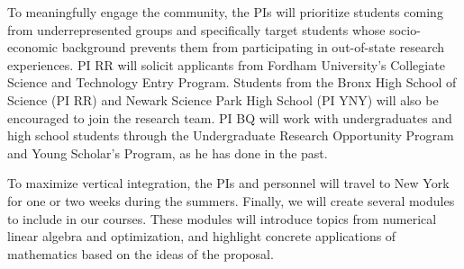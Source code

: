 To meaningfully engage the community,
the PIs will prioritize students coming
from underrepresented groups and
specifically target students whose socio-economic
background prevents them from participating in out-of-state research
experiences.  PI RR will solicit applicants from Fordham University's
Collegiate Science and Technology Entry Program.
Students from the Bronx High School of Science (PI
RR) and Newark Science Park High School (PI YNY) will also be encouraged to
join the research team. PI BQ will work with undergraduates and high
school students through the Undergraduate Research Opportunity Program
and Young Scholar's Program, as he has done in the past.

To maximize vertical integration, the PIs and personnel
will travel to New York for one or two weeks during the summers.
Finally, we will create several modules to include in our courses. These
modules will introduce topics from numerical linear algebra and
optimization, and highlight concrete applications of mathematics
based on the ideas of the proposal.



